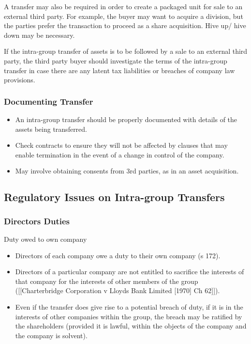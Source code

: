 \documentclass[
]{article}
\newenvironment{Shaded}{}{}
\newcommand{\NormalTok}[1]{#1}
\providecommand{\tightlist}{%
  \setlength{\itemsep}{0pt}\setlength{\parskip}{0pt}}
\begin{document}
A transfer may also be required in order to create a packaged unit for
sale to an external third party. For example, the buyer may want to
acquire a division, but the parties prefer the transaction to proceed as
a share acquisition. Hive up/ hive down may be necessary.

\begin{Shaded}
\begin{Highlighting}[]
\NormalTok{If the intra{-}group transfer of assets is to be followed by a sale to an external third party, the third party buyer should investigate the terms of the intra{-}group transfer in case there are any latent tax liabilities or breaches of company law provisions.}
\end{Highlighting}
\end{Shaded}

\hypertarget{documenting-transfer}{%
\subsubsection{Documenting Transfer}\label{documenting-transfer}}

\begin{itemize}
\tightlist
\item
  An intra-group transfer should be properly documented with details of
  the assets being transferred.
\item
  Check contracts to ensure they will not be affected by clauses that
  may enable termination in the event of a change in control of the
  company.
\item
  May involve obtaining consents from 3rd parties, as in an asset
  acquisition.
\end{itemize}

\hypertarget{regulatory-issues-on-intra-group-transfers}{%
\subsection{Regulatory Issues on Intra-group
Transfers}\label{regulatory-issues-on-intra-group-transfers}}

\hypertarget{directors-duties}{%
\subsubsection{Directors Duties}\label{directors-duties}}

Duty owed to own company

\begin{itemize}
\tightlist
\item
  Directors of each company owe a duty to their own company (s 172).
\item
  Directors of a particular company are not entitled to sacrifice the
  interests of that company for the interests of other members of the
  group ({[}{[}Charterbridge Corporation v Lloyds Bank Limited
  {[}1970{]} Ch 62{]}{]}).
\item
  Even if the transfer does give rise to a potential breach of duty, if
  it is in the interests of other companies within the group, the breach
  may be ratified by the shareholders (provided it is lawful, within the
  objects of the company and the company is solvent).
\end{itemize}
\end{document}
